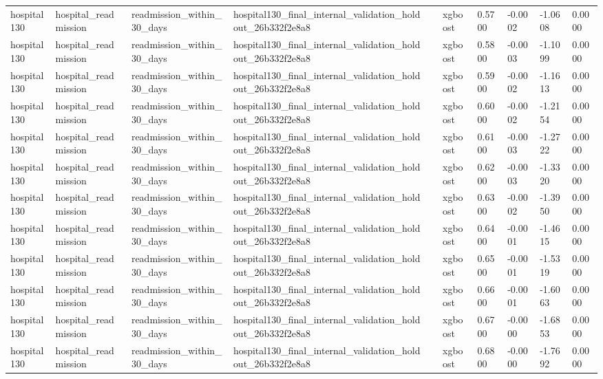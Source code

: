 \begin{tabular}{llllllllll}
hospital130 & hospital\_readmission & readmission\_within\_30\_days & hospital130\_final\_internal\_validation\_holdout\_26b332f2e8a8 &  & xgboost & 0.5700 & -0.0002 & -1.0608 & 0.0000 \\
hospital130 & hospital\_readmission & readmission\_within\_30\_days & hospital130\_final\_internal\_validation\_holdout\_26b332f2e8a8 &  & xgboost & 0.5800 & -0.0003 & -1.1099 & 0.0000 \\
hospital130 & hospital\_readmission & readmission\_within\_30\_days & hospital130\_final\_internal\_validation\_holdout\_26b332f2e8a8 &  & xgboost & 0.5900 & -0.0002 & -1.1613 & 0.0000 \\
hospital130 & hospital\_readmission & readmission\_within\_30\_days & hospital130\_final\_internal\_validation\_holdout\_26b332f2e8a8 &  & xgboost & 0.6000 & -0.0002 & -1.2154 & 0.0000 \\
hospital130 & hospital\_readmission & readmission\_within\_30\_days & hospital130\_final\_internal\_validation\_holdout\_26b332f2e8a8 &  & xgboost & 0.6100 & -0.0003 & -1.2722 & 0.0000 \\
hospital130 & hospital\_readmission & readmission\_within\_30\_days & hospital130\_final\_internal\_validation\_holdout\_26b332f2e8a8 &  & xgboost & 0.6200 & -0.0003 & -1.3320 & 0.0000 \\
hospital130 & hospital\_readmission & readmission\_within\_30\_days & hospital130\_final\_internal\_validation\_holdout\_26b332f2e8a8 &  & xgboost & 0.6300 & -0.0002 & -1.3950 & 0.0000 \\
hospital130 & hospital\_readmission & readmission\_within\_30\_days & hospital130\_final\_internal\_validation\_holdout\_26b332f2e8a8 &  & xgboost & 0.6400 & -0.0001 & -1.4615 & 0.0000 \\
hospital130 & hospital\_readmission & readmission\_within\_30\_days & hospital130\_final\_internal\_validation\_holdout\_26b332f2e8a8 &  & xgboost & 0.6500 & -0.0001 & -1.5319 & 0.0000 \\
hospital130 & hospital\_readmission & readmission\_within\_30\_days & hospital130\_final\_internal\_validation\_holdout\_26b332f2e8a8 &  & xgboost & 0.6600 & -0.0001 & -1.6063 & 0.0000 \\
hospital130 & hospital\_readmission & readmission\_within\_30\_days & hospital130\_final\_internal\_validation\_holdout\_26b332f2e8a8 &  & xgboost & 0.6700 & -0.0000 & -1.6853 & 0.0000 \\
hospital130 & hospital\_readmission & readmission\_within\_30\_days & hospital130\_final\_internal\_validation\_holdout\_26b332f2e8a8 &  & xgboost & 0.6800 & -0.0000 & -1.7692 & 0.0000 \\

\end{tabular}
